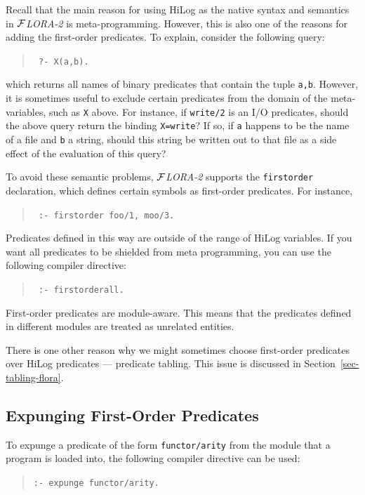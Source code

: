 \documentclass[11pt]{article}
\newcommand{\FLORA}{{\mbox{${\cal F}${\small\it LORA}\rm\emph{-2}}}\xspace}
\begin{document}
Recall that the main reason for using HiLog as the native syntax and
semantics in \FLORA is meta-programming. However, this is also one of the
reasons for adding the first-order predicates. To explain, consider the
following query:
\begin{quote}
 \tt
 ?- X(a,b).
\end{quote}
which returns all names of binary predicates that contain
the tuple {\tt a,b}. However, it is sometimes useful to exclude certain
predicates from the domain of the meta-variables, such as {\tt X} above.
For instance, if {\tt write/2}  is an I/O predicates, should the above
query return the binding {\tt X=write}? If so, if {\tt a} happens to be the
name of a file and {\tt b} a string, should this string be written out to
that file as a side effect of the evaluation of this query?

To avoid these semantic problems, \FLORA supports the {\tt firstorder}
declaration, which defines certain symbols as first-order predicates. For
instance,
\begin{quote}
 \tt
 :- firstorder foo/1, moo/3.
\end{quote}
Predicates defined in this way are outside of the range of HiLog variables.
If you want all predicates to be shielded from meta programming, you can use
the following compiler directive:
\begin{quote}
  \tt
  :- firstorderall.
\end{quote}

First-order predicates are module-aware. This means that the predicates defined
in different modules are treated as unrelated entities.

There is one other reason why we might sometimes choose first-order
predicates over HiLog predicates --- predicate tabling. This issue
is discussed in Section~\ref{sec-tabling-flora}.



\subsection{Expunging First-Order Predicates}


%
To expunge a predicate of the form {\tt functor/arity} from the module that
a program is loaded into, the following compiler directive can be used:
\begin{quote}
\verb!:- expunge functor/arity.!
\end{quote}
\end{document}
